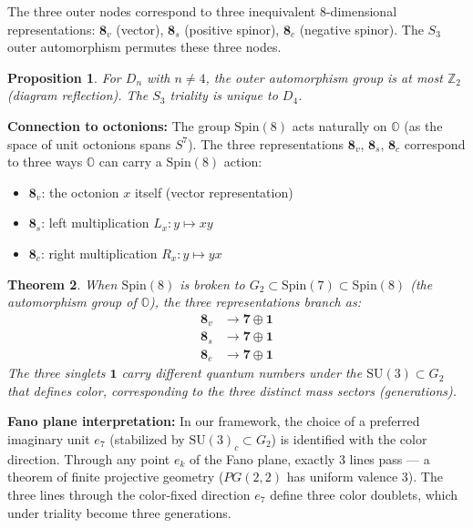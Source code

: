 \documentclass[12pt,a4paper]{article}
\newtheorem{theorem}{Theorem}
\newtheorem{proposition}[theorem]{Proposition}
\theoremstyle{definition}
\theoremstyle{remark}
\newcommand{\Oct}{\mathbb{O}}
\newcommand{\Spin}{\mathrm{Spin}}
\newcommand{\SU}{\mathrm{SU}}
\begin{document}
The three outer nodes correspond to three inequivalent 8-dimensional representations: 
$\mathbf{8}_v$ (vector), $\mathbf{8}_s$ (positive spinor), $\mathbf{8}_c$ 
(negative spinor). The $S_3$ outer automorphism permutes these three nodes.

\begin{proposition}
\label{prop:unique}
For $D_n$ with $n \neq 4$, the outer automorphism group is at most $\mathbb{Z}_2$ 
(diagram reflection). The $S_3$ triality is unique to $D_4$.
\end{proposition}

\textbf{Connection to octonions:} The group $\Spin(8)$ acts naturally on $\Oct$ 
(as the space of unit octonions spans $S^7$). The three representations 
$\mathbf{8}_v$, $\mathbf{8}_s$, $\mathbf{8}_c$ correspond to three ways 
$\Oct$ can carry a $\Spin(8)$ action:
\begin{itemize}
\item $\mathbf{8}_v$: the octonion $x$ itself (vector representation)
\item $\mathbf{8}_s$: left multiplication $L_x: y \mapsto xy$
\item $\mathbf{8}_c$: right multiplication $R_x: y \mapsto yx$
\end{itemize}

\begin{theorem}
When $\Spin(8)$ is broken to $G_2 \subset \Spin(7) \subset \Spin(8)$ (the 
automorphism group of $\Oct$), the three representations branch as:
\begin{align}
\mathbf{8}_v &\to \mathbf{7} \oplus \mathbf{1} \\
\mathbf{8}_s &\to \mathbf{7} \oplus \mathbf{1} \\
\mathbf{8}_c &\to \mathbf{7} \oplus \mathbf{1}
\end{align}
The three singlets $\mathbf{1}$ carry different quantum numbers under 
the $\SU(3) \subset G_2$ that defines color, corresponding to the three 
distinct mass sectors (generations).
\end{theorem}

\textbf{Fano plane interpretation:} In our framework, the choice of a 
preferred imaginary unit $e_7$ (stabilized by $\SU(3)_c \subset G_2$) is 
identified with the color direction. Through any point $e_k$ of the Fano 
plane, exactly 3 lines pass --- a theorem of finite projective geometry 
($PG(2,2)$ has uniform valence 3). The three lines through the color-fixed 
direction $e_7$ define three color doublets, which under triality become 
three generations.
\end{document}
